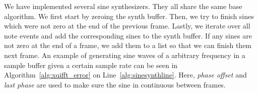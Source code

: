 \documentclass[a4paper,10pt,twocolumn]{article}
\begin{document}
We have implemented several sine synthesizers. They all share the same base algorithm. We first start by zeroing the synth buffer. Then, we try to finish sines which were not zero at the end of the previous frame. Lastly, we iterate over all note events and add the corresponding sines to the synth buffer. If any sines are not zero at the end of a frame, we add them to a list so that we can finish them next frame. An example of generating sine waves of a arbitrary frequency in a sample buffer given a certain sample rate can be seen in Algorithm~\ref{alg:xqifft_error} on Line~\ref{alg:sinesynthline}. Here, \textit{phase offset} and \textit{last phase} are used to make sure the sine in continuous between frames.




\end{document}
